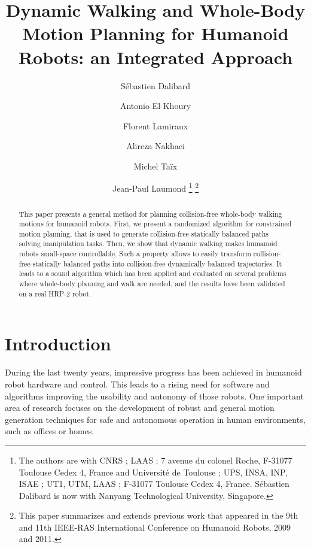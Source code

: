 \documentclass{article}
\begin{document}
\title{Dynamic Walking and Whole-Body Motion Planning for Humanoid Robots: an Integrated Approach}

\author{
  S\'ebastien Dalibard\and
  Antonio El Khoury\and
  Florent Lamiraux\and
  Alireza Nakhaei\and
  Michel Ta\"ix\and
  Jean-Paul Laumond
  \footnote{The authors are with CNRS ; LAAS ; 7 avenue du colonel Roche, F-31077
    Toulouse Cedex 4, France and Universit\'e de Toulouse ; UPS, INSA, INP, ISAE ;
    UT1, UTM, LAAS ; F-31077 Toulouse
    Cedex 4, France. S\'ebastien Dalibard is now with Nanyang Technological University, Singapore.}
  \footnote{
    This paper summarizes and extends previous work that appeared in the 9th and 11th
    IEEE-RAS International Conference on Humanoid Robots, 2009 and 2011.
  }
}

\date{}

\maketitle

\begin{abstract}

This paper presents a general method for planning collision-free whole-body walking motions
for humanoid robots. First, we present a randomized algorithm for constrained motion
planning, that is used to generate collision-free statically balanced paths solving
manipulation tasks. Then, we show that dynamic walking makes humanoid robots 
small-space controllable. Such a property allows to easily transform 
collision-free statically balanced paths into 
collision-free dynamically balanced trajectories. It leads to a sound 
algorithm which has been applied and evaluated on several
problems where whole-body planning and  walk are needed,
and the results have been validated  on a real HRP-2 robot.

\end{abstract}

\section{Introduction}

During the last twenty years, impressive progress has been achieved in humanoid
robot hardware and control. This leads to a rising need for software and algorithms
improving the usability and autonomy of those robots. One important area of research
focuses on the development of robust and general motion generation techniques for safe
and autonomous operation in human environments, such as offices or homes.
\end{document}
